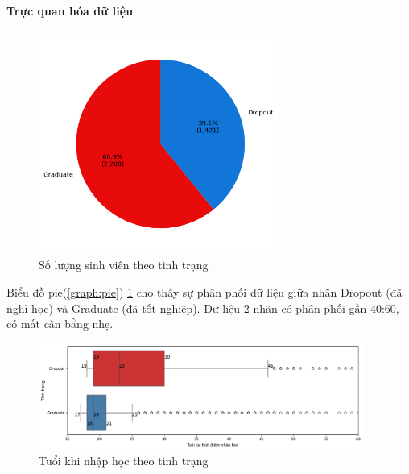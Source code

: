     \paragraph{Trực quan hóa dữ liệu}
    \leavevmode

    \begin{figure}[htp]
        \centering
        \includegraphics[width=0.70\textwidth]{images/Table_Dropout_TargetDistributionBarChart.png}
        \caption{Số lượng sinh viên theo tình trạng}
        \label{fig:Table_Dropout_TargetDistributionBarChart}
    \end{figure}

    \FloatBarrier
    
    Biểu đồ pie(\ref{graph:pie}) \ref{fig:Table_Dropout_TargetDistributionBarChart} cho thấy sự phân phối dữ liệu giữa nhãn Dropout (đã nghỉ học) và Graduate (đã tốt nghiệp). Dữ liệu 2 nhãn có phân phối gần 40:60, có mất cân bằng nhẹ. 


     \begin{figure}[htp]
        \centering
        \includegraphics[width=0.95\textwidth]{images/Table_Dropout_Age_Target.png}
        \caption{Tuổi khi nhập học theo tình trạng}
        \label{fig:Table_Dropout_Age_Target}
    \end{figure}

    \FloatBarrier

